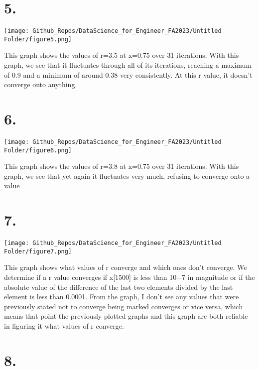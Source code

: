 \documentclass[
  letterpaper,
  DIV=11,
  numbers=noendperiod]{scrartcl}
\begin{document}
\hypertarget{section-4}{%
\section{5.}\label{section-4}}

\texttt{[image: Github\_Repos/DataScience\_for\_Engineer\_FA2023/Untitled Folder/figure5.png]}

This graph shows the values of r=3.5 at x=0.75 over 31 iterations. With
this graph, we see that it fluctuates through all of its iterations,
reaching a maximum of 0.9 and a minimum of around 0.38 very
consistently. At this r value, it doesn't converge onto anything.

\hypertarget{section-5}{%
\section{6.}\label{section-5}}

\texttt{[image: Github\_Repos/DataScience\_for\_Engineer\_FA2023/Untitled Folder/figure6.png]}

This graph shows the values of r=3.8 at x=0.75 over 31 iterations. With
this graph, we see that yet again it fluctuates very much, refusing to
converge onto a value

\hypertarget{section-6}{%
\section{7.}\label{section-6}}

\texttt{[image: Github\_Repos/DataScience\_for\_Engineer\_FA2023/Untitled Folder/figure7.png]}

This graph shows what values of r converge and which ones don't
converge. We determine if a r value converges if x{[}1500{]} is less
than 10−7 in magnitude or if the absolute value of the difference of the
last two elements divided by the last element is less than 0.0001. From
the graph, I don't see any values that were previously stated not to
converge being marked converges or vice versa, which means that point
the previously plotted graphs and this graph are both reliable in
figuring it what values of r converge.

\hypertarget{section-7}{%
\section{8.}\label{section-7}}
\end{document}
